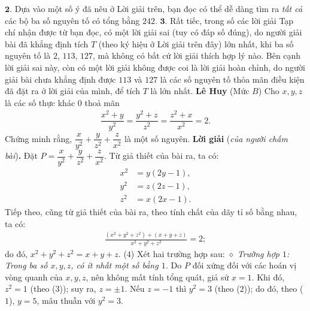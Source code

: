 \begin{multicols}{2}
	\vskip 0.05cm
	$\pmb{2.}$ Dựa vào một số ý đã nêu ở Lời giải trên, bạn đọc có thể dễ dàng tìm ra \textit{tất cả} các bộ ba số nguyên tố có tổng bằng $242$.
	\vskip 0.05cm
	$\pmb{3.}$ Rất tiếc, trong số các lời giải Tạp chí nhận được từ bạn đọc, có một lời giải sai (tuy có đáp số đúng), do người giải bài đã khẳng định tích $T$ (theo ký hiệu ở Lời giải trên đây) lớn nhất, khi ba số nguyên tố là $2$, $113$, $127$, mà không có bất cứ lời giải thích hợp lý nào. Bên cạnh lời giải sai này, còn có một lời giải không được coi là lời giải hoàn chỉnh, do người giải bài chưa khẳng định được $113$ và $127$ là các số nguyên tố thỏa mãn điều kiện đã đặt ra ở lời giải của mình, để tích $T$ là lớn nhất.
	\vskip 0.05cm
	\hfill \textbf{\color{thachthuctoanhoc}Lê Huy}
	\vskip 0.05cm
	{}
	(Mức $B$) Cho $x,y,z$ là các số thực khác $0$ thoả mãn 
	\begin{align*}
		\dfrac{x^2+y}{y^2}=\dfrac{y^2+z}{z^2}=\dfrac{z^2+x}{x^2}=2.
	\end{align*}
	Chứng minh rằng, $\dfrac x{y^2}+\dfrac y{z^2}+\dfrac z{x^2}$ là một số nguyên.
	\vskip 0.05cm
	\textbf{\color{thachthuctoanhoc}Lời giải} (\textit{của người chấm bài})\textbf{\color{thachthuctoanhoc}.}
	\vskip 0.05cm
	Đặt  $P = \dfrac{x}{{{y^2}}} + \dfrac{y}{{{z^2}}} + \dfrac{z}{{{x^2}}}$.
	\vskip 0.05cm
	Từ giả thiết của bài ra, ta có:
	\begin{align*}
		{x^2} &= y\left( {2y - 1} \right), \tag{$1$}\\
		{y^2} &= z\left( {2z - 1} \right),\tag{$2$}\\
		{z^2} &= x\left( {2x - 1} \right).\tag{$3$}
	\end{align*}
	Tiếp theo, cũng từ giả thiết của bài ra, theo tính chất của dãy tỉ số bằng nhau, ta có:
	\begin{align*}
		\frac{{\left( {{x^2} + {y^2} + {z^2}} \right) + \left( {x + y + z} \right)}}{{{x^2} + {y^2} + {z^2}}} = 2;
	\end{align*}
	do đó,  ${x^2} + {y^2} + {z^2} = x + y + z$. \hfill ($4$)
	\vskip 0.05cm                                     
	Xét hai trường hợp sau:
	\vskip 0.05cm
	$\diamond$ \textit{Trường hợp $1$: Trong ba số $x, y, z$, có ít nhất một số bằng $1$.}
	\vskip 0.05cm
	Do $P$ đối xứng đối với các hoán vị vòng quanh của $x, y, z$, nên không mất tính tổng quát, giả sử $x = 1$.
	\vskip 0.05cm
	Khi đó, $z^2 = 1$ (theo ($3$)); suy ra, $z = \pm 1$.
	\vskip 0.05cm 
	Nếu $z = -1$ thì $y^2= 3$  (theo ($2$)); do đó, theo ($1$), $y = 5$, mâu thuẫn với  $y^2 = 3$.
	\vskip 0.05cm

\end{multicols}
